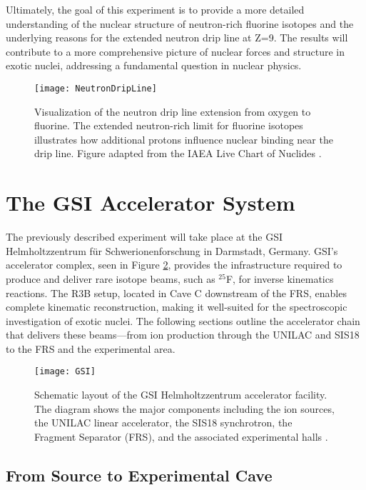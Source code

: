 Ultimately, the goal of this experiment is to provide a more detailed understanding of the nuclear structure of neutron-rich fluorine isotopes and the underlying reasons for the extended neutron drip line at Z=9. The results will contribute to a more comprehensive picture of nuclear forces and structure in exotic nuclei, addressing a fundamental question in nuclear physics.


\begin{figure}
	\texttt{[image: NeutronDripLine]}
	\caption{Visualization of the neutron drip line extension from oxygen to fluorine. The extended neutron-rich limit for fluorine isotopes illustrates how additional protons influence nuclear binding near the drip line. Figure adapted from the IAEA Live Chart of Nuclides \cite{IAEA_NuclideChart}.}
	\label{fig:NeutronDripLine}
\end{figure}


\section{The GSI Accelerator System}

The previously described experiment will take place at the GSI Helmholtzzentrum für Schwerionenforschung in Darmstadt, Germany. GSI’s accelerator complex, seen in Figure \ref{fig:GSI}, provides the infrastructure required to produce and deliver rare isotope beams, such as $^{25}$F, for inverse kinematics reactions. The \gls{R3B} setup, located in Cave C downstream of the FRS, enables complete kinematic reconstruction, making it well-suited for the spectroscopic investigation of exotic nuclei. The following sections outline the accelerator chain that delivers these beams—from ion production through the UNILAC and SIS18 to the FRS and the experimental area.

\begin{figure}
	\texttt{[image: GSI]}
	\caption{Schematic layout of the GSI Helmholtzzentrum accelerator facility. The diagram shows the major components including the ion sources, the UNILAC linear accelerator, the SIS18 synchrotron, the Fragment Separator (FRS), and the associated experimental halls \cite{gsiAcceleratorFacility}.}
	\label{fig:GSI}
\end{figure}


\subsection{From Source to Experimental Cave}

